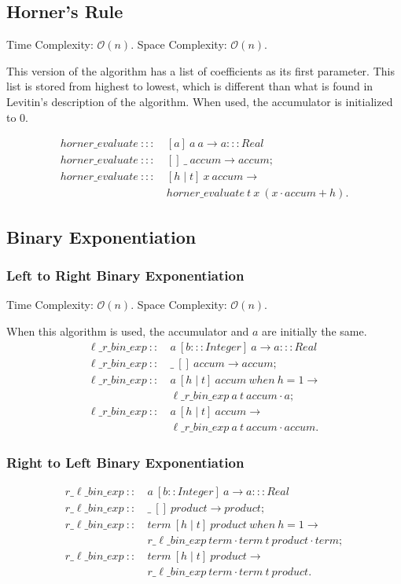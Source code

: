 \documentclass[a4paper,10pt]{book}
\newcommand\when{\  when\ }
\begin{document}
\subsection{Horner's Rule}Time Complexity: $\mathcal{O}(n)$. Space Complexity: $\mathcal{O}(n)$.

This version of the algorithm has a list of coefficients as its first parameter. This list is stored from highest to lowest, which is different than what is found in Levitin's description of the algorithm. When used, the accumulator is initialized to $0$.

\begin{align*}
horner\_evaluate\ :::\ & [a]\ a\ a\rightarrow a:::Real\\
horner\_evaluate\ :::\ &[]\ \_\ accum\rightarrow accum;\\
horner\_evaluate\ :::\ &[h\mid t]\ x\ accum\rightarrow\\
	&horner\_evaluate\ t\ x\ (x\cdot accum+h).
\end{align*}

\subsection{Binary Exponentiation}
\subsubsection{Left to Right Binary Exponentiation}Time Complexity: $\mathcal{O}(n)$. Space Complexity: $\mathcal{O}(n)$.

When this algorithm is used, the accumulator and $a$ are initially the same.
\begin{align*}
\ell\_r\_bin\_exp\ ::\ &a\ [b:::Integer]\ a\rightarrow a:::Real\\
\ell\_r\_bin\_exp\ ::\ &\_\ []\ accum\rightarrow accum;\\
\ell\_r\_bin\_exp\ ::\ &a\ [h\mid t]\ accum\when h=1\rightarrow\\
	&\ell\_r\_bin\_exp\ a\ t\ accum\cdot a;\\
\ell\_r\_bin\_exp\ ::\ &a\ [h\mid t]\ accum\rightarrow\\
	&\ell\_r\_bin\_exp\ a\ t\ accum\cdot accum.
\end{align*}
\subsubsection{Right to Left Binary Exponentiation}
\begin{align*}
r\_\ell\_bin\_exp\ ::\ &a\ [b::Integer]\ a\rightarrow a:::Real\\
r\_\ell\_bin\_exp\ ::\ &\_\ []\ product\rightarrow product;\\
r\_\ell\_bin\_exp\ ::\ &term\ [h\mid t]\ product\when h=1\rightarrow\\
	&r\_\ell\_bin\_exp\ term\cdot term\ t\ product\cdot term;\\
r\_\ell\_bin\_exp\ ::\ &term\ [h\mid t]\ product\rightarrow\\
	&r\_\ell\_bin\_exp\ term\cdot term\ t\ product.
\end{align*}
\end{document}
